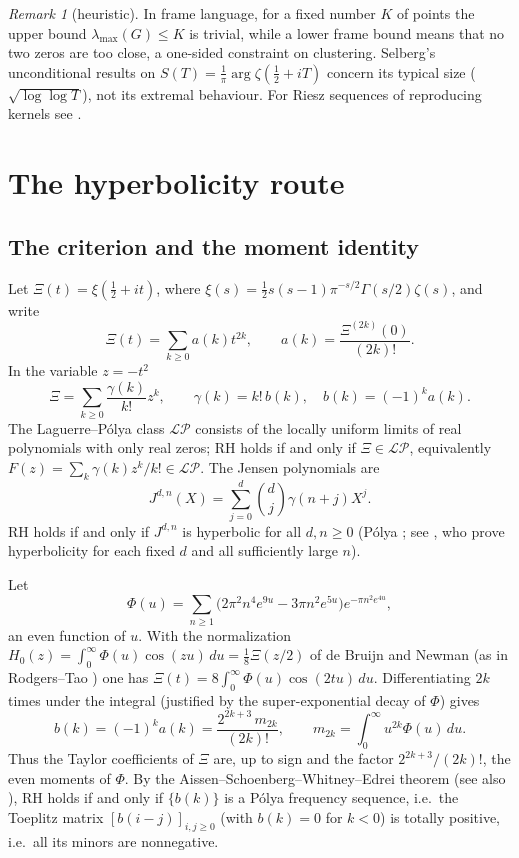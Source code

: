 \documentclass[11pt]{amsart}
\theoremstyle{definition}
\theoremstyle{remark}
\newtheorem{remark}[theorem]{Remark}
\newcommand{\half}{\tfrac12}
\newcommand{\LP}{\mathcal{LP}}
\begin{document}
\begin{remark}[heuristic]\label{rem:hodgecap}
In frame language, for a fixed number $K$ of points the upper bound $\lambda_{\max}(G)\le K$ is trivial, while a
lower frame bound means that no two zeros are too close, a one-sided constraint on clustering. Selberg's
unconditional results on $S(T)=\frac1\pi\arg\zeta(\half+iT)$ concern its typical size
($\sqrt{\log\log T}$), not its extremal behaviour. For Riesz sequences of reproducing kernels see \cite{Pavlov,Seip}.
\end{remark}

\section{The hyperbolicity route}\label{sec:hyp}

\subsection{The criterion and the moment identity}
Let $\Xi(t)=\xi(\half+it)$, where $\xi(s)=\tfrac12s(s-1)\pi^{-s/2}\Gamma(s/2)\zeta(s)$, and write
\[\Xi(t)=\sum_{k\ge0}a(k)t^{2k},\qquad a(k)=\frac{\Xi^{(2k)}(0)}{(2k)!}.\]
In the variable $z=-t^2$
\[
\Xi=\sum_{k\ge0}\frac{\gamma(k)}{k!}z^k,\qquad \gamma(k)=k!\,b(k),\quad b(k)=(-1)^ka(k).
\]
The Laguerre--P\'olya class $\LP$ consists of the locally uniform limits of real polynomials with only real
zeros; RH holds if and only if $\Xi\in\LP$, equivalently $F(z)=\sum_k\gamma(k)z^k/k!\in\LP$. The Jensen
polynomials are
\begin{equation}\label{eq:jensen}
J^{d,n}(X)=\sum_{j=0}^d\binom{d}{j}\gamma(n+j)X^j .
\end{equation}
RH holds if and only if $J^{d,n}$ is hyperbolic for all $d,n\ge0$ (Pólya \cite{Polya}; see \cite{GORZ}, who
prove hyperbolicity for each fixed $d$ and all sufficiently large $n$).

Let
\[
\Phi(u)=\sum_{n\ge1}\big(2\pi^2n^4e^{9u}-3\pi n^2e^{5u}\big)e^{-\pi n^2e^{4u}},
\]
an even function of $u$. With the normalization $H_0(z)=\int_0^\infty\Phi(u)\cos(zu)\,du=\frac18\Xi(z/2)$
of de Bruijn and Newman (as in Rodgers--Tao \cite{RT}) one has $\Xi(t)=8\int_0^\infty\Phi(u)\cos(2tu)\,du$.
Differentiating $2k$ times under the integral (justified by the super-exponential decay of $\Phi$) gives
\begin{equation}\label{eq:moment}
b(k)=(-1)^k a(k)=\frac{2^{2k+3}\,m_{2k}}{(2k)!},\qquad m_{2k}=\int_0^\infty u^{2k}\Phi(u)\,du .
\end{equation}
Thus the Taylor coefficients of $\Xi$ are, up to sign and the factor $2^{2k+3}/(2k)!$, the even moments of $\Phi$.
By the Aissen--Schoenberg--Whitney--Edrei theorem \cite{Edrei} (see also \cite{Karlin}), RH holds if and only
if $\{b(k)\}$ is a Pólya frequency sequence, i.e.\ the Toeplitz matrix $[b(i-j)]_{i,j\ge0}$ (with $b(k)=0$ for
$k<0$) is totally positive, i.e.\ all its minors are nonnegative.
\end{document}
